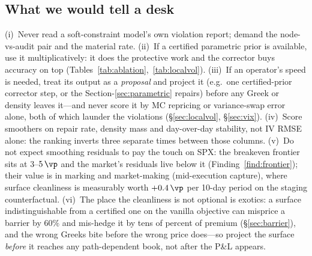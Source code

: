 \subsection{What we would tell a desk}

(i)~Never read a soft-constraint model's own violation report; demand the node-vs-audit
pair and the material rate. (ii)~If a certified parametric prior is available, use it
multiplicatively: it does the protective work and the corrector buys accuracy on top
(Tables~\ref{tab:ablation},~\ref{tab:localvol}). (iii)~If an operator's speed is needed,
treat its output as a \emph{proposal} and project it (e.g.\ one certified-prior corrector
step, or the Section-\ref{sec:parametric} repairs) before any Greek or density leaves
it---and never score it by MC repricing or variance-swap error alone, both of which launder
the violations (\S\ref{sec:localvol}, \S\ref{sec:vix}). (iv)~Score smoothers on repair
rate, density mass and day-over-day stability, not IV RMSE alone: the ranking inverts three
separate times between those columns. (v)~Do not expect smoothing residuals to pay the
touch on SPX: the breakeven frontier sits at $3$--$5\,\vp$ and the market's residuals live
below it (Finding~\ref{find:frontier}); their value is in marking and market-making
(mid-execution capture), where surface cleanliness is measurably worth
$+0.4\,\vp$ per 10-day period on the staging counterfactual.
(vi)~The place the cleanliness is not optional is exotics: a surface indistinguishable from a
certified one on the vanilla objective can misprice a barrier by $60\%$ and mis-hedge it by
tens of percent of premium (\S\ref{sec:barrier}), and the wrong Greeks bite before the wrong
price does---so project the surface \emph{before} it reaches any path-dependent book, not after
the P\&L appears.